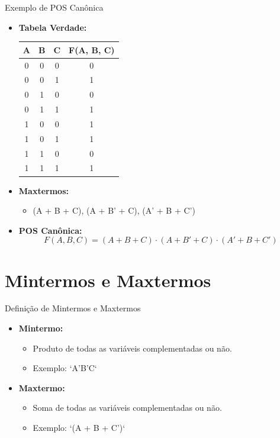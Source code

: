 \begin{frame}{Exemplo de POS Canônica}
	\begin{itemize}
		\item \textbf{Tabela Verdade:}
		\begin{tabular}{|c|c|c|c|}
			\hline
			A & B & C & F(A, B, C) \\
			\hline
			0 & 0 & 0 & 0 \\
			0 & 0 & 1 & 1 \\
			0 & 1 & 0 & 0 \\
			0 & 1 & 1 & 1 \\
			1 & 0 & 0 & 1 \\
			1 & 0 & 1 & 1 \\
			1 & 1 & 0 & 0 \\
			1 & 1 & 1 & 1 \\
			\hline
		\end{tabular}
		\item \textbf{Maxtermos:}
		\begin{itemize}
			\item (A + B + C), (A + B' + C), (A' + B + C')
		\end{itemize}
		\item \textbf{POS Canônica:}
		\[
		F(A,B,C) = (A + B + C) \cdot (A + B' + C) \cdot (A' + B + C')
		\]
	\end{itemize}
\end{frame}

\section{Mintermos e Maxtermos}

\begin{frame}{Definição de Mintermos e Maxtermos}
	\begin{itemize}
		\item \textbf{Mintermo:}
		\begin{itemize}
			\item Produto de todas as variáveis complementadas ou não.
			\item Exemplo: `A'B'C`
		\end{itemize}
		\item \textbf{Maxtermo:}
		\begin{itemize}
			\item Soma de todas as variáveis complementadas ou não.
			\item Exemplo: `(A + B + C')`
		\end{itemize}
	\end{itemize}
\end{frame}

